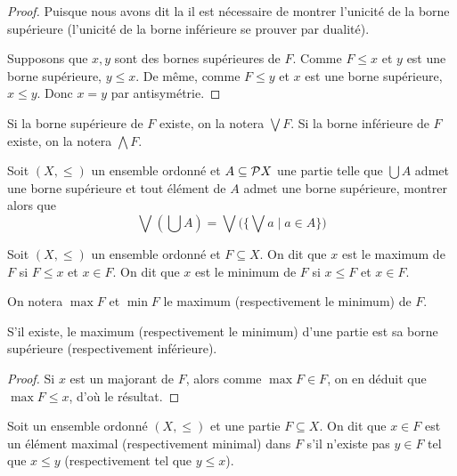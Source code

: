 \begin{proof}
  Puisque nous avons dit \og la\fg{} il est nécessaire de montrer l'unicité de
  la borne supérieure (l'unicité de la borne inférieure se prouver par dualité).

  Supposons que $x,y$ sont des bornes supérieures de $F$. Comme $F\leq x$ et
  $y$ est une borne supérieure, $y\leq x$. De même, comme $F\leq y$ et $x$ est
  une borne supérieure, $x\leq y$. Donc $x = y$ par antisymétrie.
\end{proof}

\begin{notation}
  Si la borne supérieure de $F$ existe, on la notera $\bigvee F$. Si la borne
  inférieure de $F$ existe, on la notera $\bigwedge F$.
\end{notation}

\begin{exercise}
  Soit $(X,\leq)$ un ensemble ordonné et $A\subseteq \mathcal{P} X$ une partie
  telle que $\bigcup A$ admet une borne supérieure et tout élément de $A$ admet
  une borne supérieure, montrer alors que
  \[\bigvee (\bigcup A) =
  \bigvee\Big(\Big\{ \bigvee a \;\Big|\; a \in A\Big\}\Big)\]
\end{exercise}

\begin{definition}
  Soit $(X,\leq)$ un ensemble ordonné et $F\subseteq X$. On dit que $x$ est le
  maximum de $F$ si $F\leq x$ et $x\in F$. On dit que $x$ est le minimum de $F$
  si $x\leq F$ et $x\in F$.
\end{definition}

\begin{notation}
  On notera $\max F$ et $\min F$ le maximum (respectivement le minimum) de $F$.
\end{notation}

\begin{property}
  S'il existe, le maximum (respectivement le minimum) d'une partie est sa borne
  supérieure (respectivement inférieure).
\end{property}

\begin{proof}
  Si $x$ est un majorant de $F$, alors comme $\max F \in F$, on en déduit que
  $\max F \leq x$, d'où le résultat.
\end{proof}

\begin{definition}
  Soit un ensemble ordonné $(X,\leq)$ et une partie $F\subseteq X$. On dit que
  $x \in F$ est un élément maximal (respectivement minimal) dans $F$ s'il
  n'existe pas $y\in F$ tel que $x\leq y$ (respectivement tel que $y\leq x$).
\end{definition}

